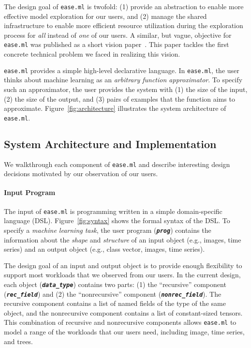 \documentclass[letterpaper]{vldb}
\newcommand{\eml}{\texttt{ease.ml}\xspace}
\begin{document}
The design goal of \eml is twofold: (1) provide an abstraction
to enable more effective model exploration for our users, and 
(2) manage the shared infrastructure to enable more efficient
resource utilization during the exploration process 
for {\em all} instead of {\em one} of our users.
A similar, but vague, objective for \eml was published as a short vision paper~\cite{Zhang2017a}. This paper tackles the first
concrete technical problem we faced in realizing this
vision.

\eml provides a simple high-level declarative language.
In \eml, the user thinks about machine learning as an {\em arbitrary function approximator}.
To specify such an approximator, the user provides the
system with (1) the size of the input, (2) the size of the output,
and (3) pairs of examples that the function aims to approximate.
Figure~\ref{fig:architecture} illustrates the system architecture of \eml.

\vspace{-0.5em}
\subsection{System Architecture and Implementation}

We walkthrough each component of \eml and 
describe interesting design decisions
motivated by our observation of our users. 

\vspace{-1em}
\paragraph*{Input Program} The input
of \eml is programming written in 
a simple domain-specific language (DSL). Figure~\ref{fig:syntax}
shows the formal syntax of the DSL. To specify
a {\em machine learning task}, the user program (\textbf{\texttt{\em prog}})
contains the information about the {\em shape}
and {\em structure} of an input object (e.g., images, time series)
and an output object (e.g., class vector, images, time series).

The design goal of an input and output
object is to provide enough flexibility to support most
workloads that we observed from our users. In the current design,
each object (\textbf{\texttt{\em data\_type}}) contains two parts:
(1) the ``recursive'' component (\textbf{\texttt{\em rec\_field}})
and (2) the ``nonrecursive'' component (\textbf{\texttt{\em nonrec\_field}}).
The recursive component contains a list of named 
fields of the type of the same object, and the nonrecursive
component contains a list of constant-sized tensors.
This combination of recursive and nonrecursive
components allows \eml to model a range of the workloads that our users need, including image, time series, and trees.
\end{document}
